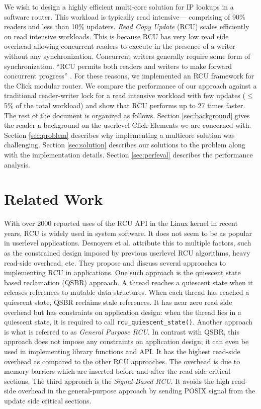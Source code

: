 \documentclass[a4paper,marginparwidth=50pt,marginparsep=10pt]{article}
\begin{document}
We wish to design a highly efficient multi-core solution for IP lookups in a software router. This workload is typically read intensive--- comprising of 90\% readers and less than 10\% updaters. \emph{Read Copy Update} (RCU) \cite{readcopyupdate} scales efficiently on read intensive workloads. This is because RCU has very low read side overhead allowing concurrent readers to execute in the presence of a writer without any synchronization. Concurrent writers generally require some form of synchronization. ``RCU permits both readers and writers to make forward concurrent progress'' \cite{urcu}. For these reasons, we implemented an RCU framework for the Click modular router. We compare the performance of our approach against a traditional reader-writer lock for a read intensive workload with few updates ($\le$ 5\% of the total workload) and show that RCU performs up to 27 times faster.\\

The rest of the document is organized as follows. Section \ref{sec:background} gives the reader a background on the userlevel Click Elements we are concerned with. Section \ref{sec:problem} describes why implementing a multicore solution was challenging. Section \ref{sec:solution} describes our solutions to the problem along with the implementation details. Section \ref{sec:perfeval} describes the performance analysis.
\section{Related Work}
With over 2000 reported uses of the RCU API \cite{rcuusage} in the Linux kernel in recent years, RCU is widely used in system software. It does not seem to be as popular in userlevel applications. Desnoyers et al. \cite{urcu} attribute this to multiple factors, such as the constrained design imposed by previous userlevel RCU algorithms, heavy read-side overhead, etc. They propose and discuss several approaches to implementing RCU in applications. One such approach is the quiescent state based reclamation (QSBR) approach. A thread reaches a quiescent state when it releases references to mutable data structures. When each thread has reached a quiescent state, QSBR reclaims stale references. It has near zero read side overhead but has constraints on application design: when the thread lies in a quiescent state, it is required to call \verb+rcu_quiescent_state()+. Another approach is what is referred to as \emph{General Purpose RCU}. In contrast with QSBR, this approach does not impose any constraints on application design; it can even be used in implementing library functions and API. It has the highest read-side overhead as compared to the other RCU approaches. The overhead is due to memory barriers which are inserted before and after the read side critical sections. The third approach is the \emph{Signal-Based RCU}. It avoids the high read-side overhead in the general-purpose approach by sending POSIX signal from the update side critical sections.
\end{document}
